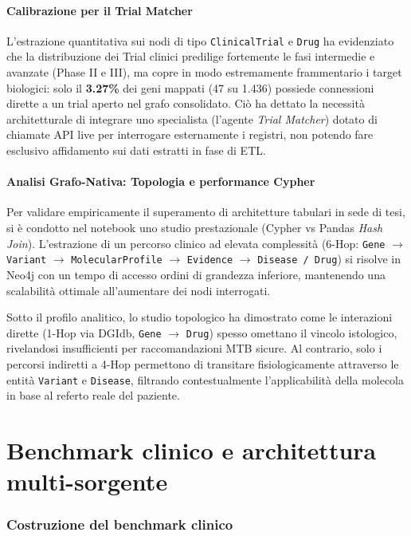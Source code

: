 \documentclass[11pt,a4paper]{article}
\newcommand{\code}[1]{\texttt{\small #1}}
\begin{document}
\subsection{Calibrazione per il Trial Matcher}
L'estrazione quantitativa sui nodi di tipo \code{ClinicalTrial} e \code{Drug} ha evidenziato che la distribuzione dei Trial clinici predilige fortemente le fasi intermedie e avanzate (Phase II e III), ma copre in modo estremamente frammentario i target biologici: solo il \textbf{3.27\%} dei geni mappati (47 su 1.436) possiede connessioni dirette a un trial aperto nel grafo consolidato. Ciò ha dettato la necessit\`a architetturale di integrare uno specialista (l'agente \emph{Trial Matcher}) dotato di chiamate API live per interrogare esternamente i registri, non potendo fare esclusivo affidamento sui dati estratti in fase di ETL.

\subsection{Analisi Grafo-Nativa: Topologia e performance Cypher}
Per validare empiricamente il superamento di architetture tabulari in sede di tesi, si \`e condotto nel notebook uno studio prestazionale (Cypher vs Pandas \emph{Hash Join}). L'estrazione di un percorso clinico ad elevata complessit\`a (6-Hop: \code{Gene} $\to$ \code{Variant} $\to$ \code{MolecularProfile} $\to$ \code{Evidence} $\to$ \code{Disease / Drug}) si risolve in Neo4j con un tempo di accesso ordini di grandezza inferiore, mantenendo una scalabilit\`a ottimale all'aumentare dei nodi interrogati.

Sotto il profilo analitico, lo studio topologico ha dimostrato come le interazioni dirette (1-Hop via DGIdb, \code{Gene} $\to$ \code{Drug}) spesso omettano il vincolo istologico, rivelandosi insufficienti per raccomandazioni MTB sicure. Al contrario, solo i percorsi indiretti a 4-Hop permettono di transitare fisiologicamente attraverso le entit\`a \code{Variant} e \code{Disease}, filtrando contestualmente l'applicabilit\`a della molecola in base al referto reale del paziente.

\part{Benchmark clinico e architettura multi-sorgente}

\section{Costruzione del benchmark clinico}
\end{document}
